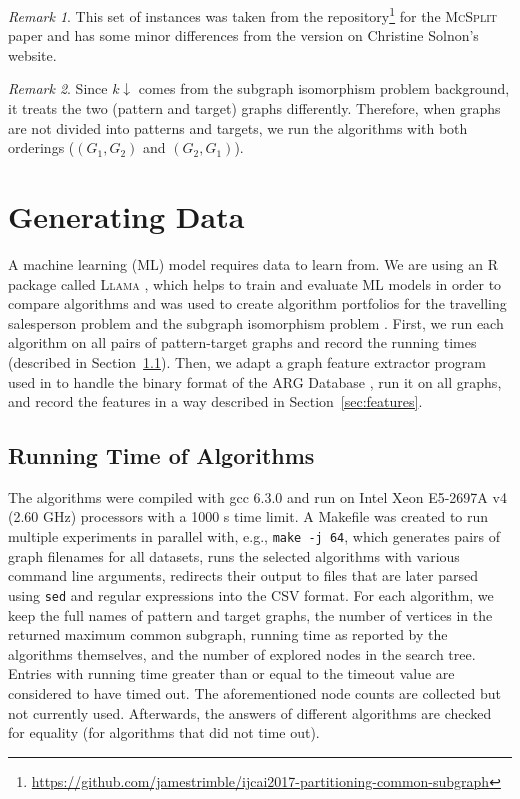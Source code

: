 \documentclass{l4proj}
\theoremstyle{definition}
\theoremstyle{remark}
\newtheorem{remark}{Remark}[chapter]
\begin{document}
\begin{remark}
This set of instances was taken from the
repository\footnote{\url{https://github.com/jamestrimble/ijcai2017-partitioning-common-subgraph}}
for the \textsc{McSplit} paper \cite{DBLP:conf/ijcai/McCreeshPT17} and has some
minor differences from the version on Christine Solnon's website.
\end{remark}

\begin{remark}
  Since $k{\downarrow}$ comes from the subgraph isomorphism problem background, it
  treats the two (pattern and target) graphs differently. Therefore, when graphs
  are not divided into patterns and targets, we run the algorithms with both
  orderings ($(G_1, G_2)$ and $(G_2, G_1)$).
\end{remark}

\chapter{Generating Data} \label{chapter:generating_data}
A machine learning (ML) model requires data to learn from. We are using an R
package called \textsc{Llama} \cite{kotthoff_llama_2013, llama}, which helps to train
and evaluate ML models in order to compare algorithms and was used to create
algorithm portfolios for the travelling salesperson problem
\cite{DBLP:conf/lion/KotthoffKHT15} and the subgraph isomorphism problem
\cite{DBLP:conf/lion/KotthoffMS16}. First, we run each algorithm on all pairs of
pattern-target graphs and record the running times (described in
Section~\ref{sec:runtimes}). Then, we adapt a graph feature extractor program
used in \cite{DBLP:conf/lion/KotthoffMS16} to handle the binary format of the
ARG Database \cite{foggia2001-2, DBLP:journals/prl/SantoFSV03}, run it on all
graphs, and record the features in a way described in
Section~\ref{sec:features}.

\section{Running Time of Algorithms} \label{sec:runtimes}

The algorithms were compiled with gcc 6.3.0 and run on Intel Xeon E5-2697A v4
(2.60 GHz) processors with a \num{1000} s time limit. A Makefile was created to
run multiple experiments in parallel with, e.g., \texttt{make -j 64}, which
generates pairs of graph filenames for all datasets, runs the selected
algorithms with various command line arguments, redirects their output to files
that are later parsed using \texttt{sed} and regular expressions into the CSV
format. For each algorithm, we keep the full names of pattern and target graphs,
the number of vertices in the returned maximum common subgraph, running time as
reported by the algorithms themselves, and the number of explored nodes in the
search tree. Entries with running time greater than or equal to the timeout
value are considered to have timed out. The aforementioned node counts are
collected but not currently used. Afterwards, the answers of different
algorithms are checked for equality (for algorithms that did not time out).
\end{document}
